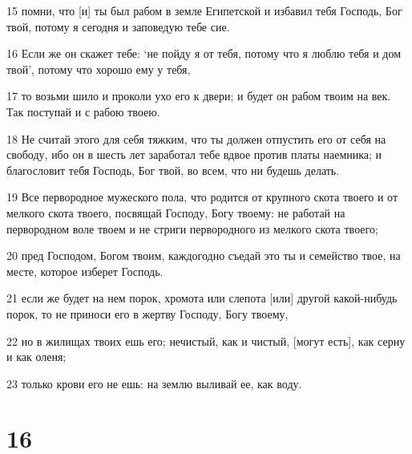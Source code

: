 \par 15 помни, что [и] ты был рабом в земле Египетской и избавил тебя Господь, Бог твой, потому я сегодня и заповедую тебе сие.
\par 16 Если же он скажет тебе: `не пойду я от тебя, потому что я люблю тебя и дом твой', потому что хорошо ему у тебя,
\par 17 то возьми шило и проколи ухо его к двери; и будет он рабом твоим на век. Так поступай и с рабою твоею.
\par 18 Не считай этого для себя тяжким, что ты должен отпустить его от себя на свободу, ибо он в шесть лет заработал тебе вдвое против платы наемника; и благословит тебя Господь, Бог твой, во всем, что ни будешь делать.
\par 19 Все первородное мужеского пола, что родится от крупного скота твоего и от мелкого скота твоего, посвящай Господу, Богу твоему: не работай на первородном воле твоем и не стриги первородного из мелкого скота твоего;
\par 20 пред Господом, Богом твоим, каждогодно съедай это ты и семейство твое, на месте, которое изберет Господь.
\par 21 если же будет на нем порок, хромота или слепота [или] другой какой-нибудь порок, то не приноси его в жертву Господу, Богу твоему,
\par 22 но в жилищах твоих ешь его; нечистый, как и чистый, [могут есть], как серну и как оленя;
\par 23 только крови его не ешь: на землю выливай ее, как воду.

\chapter{16}

